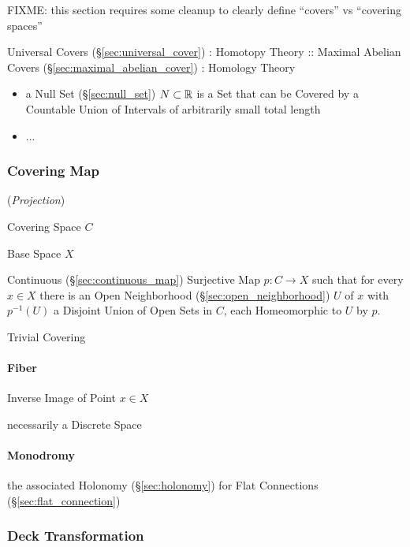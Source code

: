 FIXME: this section requires some cleanup to clearly define ``covers''
vs ``covering spaces''

Universal Covers (\S\ref{sec:universal_cover}) : Homotopy Theory ::
Maximal Abelian Covers (\S\ref{sec:maximal_abelian_cover}) : Homology
Theory

\begin{itemize}
  \item a Null Set (\S\ref{sec:null_set}) $N \subset \mathbb{R}$ is a Set that can
    be Covered by a Countable Union of Intervals of arbitrarily small total
    length
  \item ...
\end{itemize}



\subsubsection{Covering Map}\label{sec:covering_map}

(\emph{Projection})

Covering Space $C$

Base Space $X$

Continuous (\S\ref{sec:continuous_map}) Surjective Map $p : C
\rightarrow X$ such that for every $x \in X$ there is an Open
Neighborhood (\S\ref{sec:open_neighborhood}) $U$ of $x$ with
$p^{-1}(U)$ a Disjoint Union of Open Sets in $C$, each Homeomorphic to
$U$ by $p$.

Trivial Covering



\paragraph{Fiber}\label{sec:point_fiber}\hfill

Inverse Image of Point $x \in X$

necessarily a Discrete Space



\paragraph{Monodromy}\label{sec:monodromy}\hfill

\fist the associated Holonomy (\S\ref{sec:holonomy}) for Flat Connections
(\S\ref{sec:flat_connection})



\subsubsection{Deck Transformation}\label{sec:deck_transformation}

